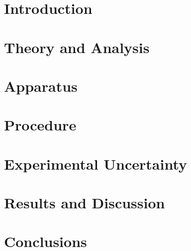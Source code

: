 \documentclass[12pt]{article}
\begin{document}



\newpage


\section{Introduction} \label{sec:1}

\clearpage
\section{Theory and Analysis} \label{sec:2}

\clearpage
\section{Apparatus} \label{sec:3}

\clearpage
\section{Procedure} \label{sec:4}

\clearpage
\section{Experimental Uncertainty} \label{sec:5}

\clearpage
\section{Results and Discussion} \label{sec:6}


\clearpage
\section{Conclusions} \label{sec:7}


\clearpage
\label{sec:8}
\begin{thebibliography}{9}

    
    
\end{thebibliography}
\end{document}
